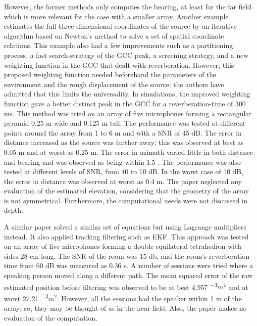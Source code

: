 \documentclass{report}
\newcommand{\e}[1]{\times 10^{#1}}
\begin{document}
However, the former methods only computes the bearing, at least for the far field which is more relevant for the case with a smaller array. Another example \cite{chen_sound_2019} estimates the full three-dimensional coordinates of the source by an iterative algorithm based on Newton's method to solve a set of spatial coordinate relations. This example also had a few improvements such as a partitioning process, a fast search-strategy of the GCC peak, a screening strategy, and a new weighting function in the GCC that dealt with reverberation. However, this proposed weighting function needed beforehand the parameters of the environment and the rough displacement of the source; the authors have admitted that this limits the universality. In simulations, the improved weighting function gave a better distinct peak in the GCC for a reverberation-time of 300 \si{ms}. This method was tried on an array of five microphones forming a rectangular pyramid 0.25 \si{m} wide and 0.125 \si{m} tall. The performance was tested at different points around the array from 1 to 6 \si{m} and with a SNR of 45 \si{dB}. The error in distance increased as the source was further away; this was observed at best as 0.05 \si{m} and at worst as 0.25 \si{m}. The error in azimuth varied little in both distance and bearing and was observed as being within 1.5 \si{\deg}. The performance was also tested at different levels of SNR, from 40 to 10 \si{dB}. In the worst case of 10 \si{dB}, the error in distance was observed at worst as 0.4 \si{m}. The paper neglected any evaluation of the estimated elevation, considering that the geometry of the array is not symmetrical. Furthermore, the computational needs were not discussed in depth.

A similar paper \cite{bechler_system_2004} solved a similar set of equations but using Lagrange multipliers instead. It also applied tracking filtering such as EKF. This approach was tested on an array of five microphones forming a double equilateral tetrahedron with sides 28 \si{cm} long. The SNR of the room was 15 \si{db}, and the room's reverberation-time from 60 \si{dB} was measured as 0.36 \si{s}. A number of sessions were tried where a speaking person moved along a different path. The mean squared error of the raw estimated position before filtering was observed to be at best 4.957 \si{\e{-3}}{$m^2$} and at worst 27.21 \si{\e{-3}}{$m^2$}. However, all the sessions had the speaker within 1 \si{m} of the array; so, they may be thought of as in the near field. Also, the paper makes no evaluation of the computation.
\end{document}
